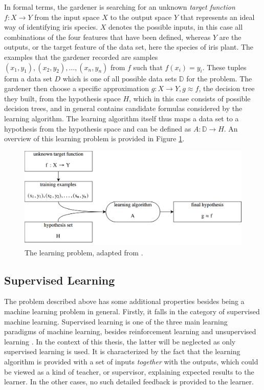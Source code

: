 In formal terms, the gardener is searching for an unknown \textit{target function} $f:X \rightarrow Y$ from the input space $X$ to the output space $Y$ \cite{abu2012learning} that represents an ideal way of identifying iris species. $X$ denotes the possible inputs, in this case all combinations of the four features that have been defined, whereas $Y$ are the outputs, or the target feature of the data set, here the species of iris plant. The examples that the gardener recorded are samples $(x_1,y_1),(x_2,y_2),\dots,(x_n,y_n)$ from $f$ such that $f(x_i)=y_i$. These tuples form a data set $D$ which is one of all possible data sets $\mathbb{D}$ for the problem. The gardener then choose a specific approximation $g:X \rightarrow Y,g\approx f$, the decision tree they built, from the hypothesis space $H$, which in this case consists of possible decision trees, and in general contains candidate formulas considered by the learning algorithm. The learning algorithm itself thus maps a data set to a hypothesis from the hypothesis space and can be defined as $A:\mathbb{D}\rightarrow H$. An overview of this learning problem is provided in Figure \ref{fig:learning_problem}.

\begin{figure}
\centering
\includegraphics[width=\textwidth]{gfx/machine_learning.png}
\caption{The learning problem, adapted from \cite{abu2012learning}.}
\label{fig:learning_problem}
\end{figure}

\subsection{Supervised Learning}
The problem described above has some additional properties besides being a machine learning problem in general. Firstly, it falls in the category of supervised machine learning. Supervised learning is one of the three main learning paradigms of machine learning, besides reinforcement learning and unsupervised learning \cite{abu2012learning}. In the context of this thesis, the latter will be neglected as only supervised learning is used. It is characterized by the fact that the learning algorithm is provided with a set of inputs \textit{together} with the outputs, which could be viewed as a kind of teacher, or supervisor, explaining expected results to the learner. In the other cases, no such detailed feedback is provided to the learner. 

